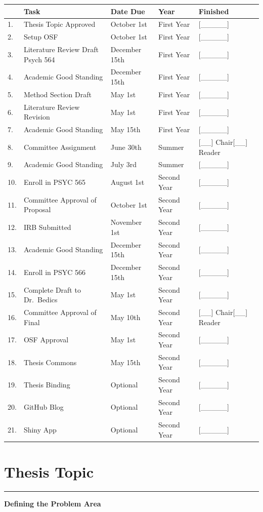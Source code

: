 \documentclass[openany]{book}
\begin{document}
\begin{longtable}[]{@{}lllll@{}}
\toprule
& Task & Date Due & Year & Finished\tabularnewline
\midrule
\endhead
1. & Thesis Topic Approved & October 1st & First Year & {[}\_\_\_\_\_{]}\tabularnewline
2. & Setup OSF & October 1st & First Year & {[}\_\_\_\_\_{]}\tabularnewline
3. & Literature Review Draft Psych 564 & December 15th & First Year & {[}\_\_\_\_\_{]}\tabularnewline
4. & Academic Good Standing & December 15th & First Year & {[}\_\_\_\_\_{]}\tabularnewline
5. & Method Section Draft & May 1st & First Year & {[}\_\_\_\_\_{]}\tabularnewline
6. & Literature Review Revision & May 1st & First Year & {[}\_\_\_\_\_{]}\tabularnewline
7. & Academic Good Standing & May 15th & First Year & {[}\_\_\_\_\_{]}\tabularnewline
8. & Committee Assignment & June 30th & Summer & {[}\_\_{]} Chair{[}\_\_{]} Reader\tabularnewline
9. & Academic Good Standing & July 3rd & Summer & {[}\_\_\_\_\_{]}\tabularnewline
10. & Enroll in PSYC 565 & August 1st & Second Year & {[}\_\_\_\_\_{]}\tabularnewline
11. & Committee Approval of Proposal & October 1st & Second Year & {[}\_\_\_\_\_{]}\tabularnewline
12. & IRB Submitted & November 1st & Second Year & {[}\_\_\_\_\_{]}\tabularnewline
13. & Academic Good Standing & December 15th & Second Year & {[}\_\_\_\_\_{]}\tabularnewline
14. & Enroll in PSYC 566 & December 15th & Second Year & {[}\_\_\_\_\_{]}\tabularnewline
15. & Complete Draft to Dr.~Bedics & May 1st & Second Year & {[}\_\_\_\_\_{]}\tabularnewline
16. & Committee Approval of Final & May 10th & Second Year & {[}\_\_{]} Chair{[}\_\_{]} Reader\tabularnewline
17. & OSF Approval & May 1st & Second Year & {[}\_\_\_\_\_{]}\tabularnewline
18. & Thesis Commons & May 15th & Second Year & {[}\_\_\_\_\_{]}\tabularnewline
19. & Thesis Binding & Optional & Second Year & {[}\_\_\_\_\_{]}\tabularnewline
20. & GitHub Blog & Optional & Second Year & {[}\_\_\_\_\_{]}\tabularnewline
21. & Shiny App & Optional & Second Year & {[}\_\_\_\_\_{]}\tabularnewline
\bottomrule
\end{longtable}

\hypertarget{thesis-topic}{%
\section{Thesis Topic}\label{thesis-topic}}

\begin{center}\rule{0.5\linewidth}{0.5pt}\end{center}

\textbf{Defining the Problem Area}
\end{document}
